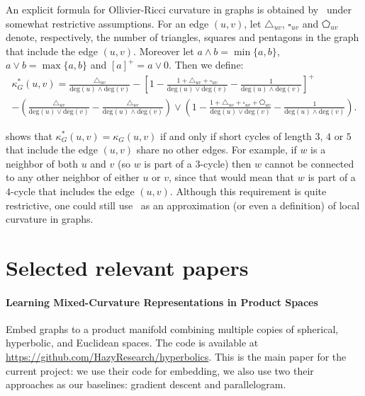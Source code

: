 \documentclass{article}
\begin{document}
An explicit formula for Ollivier-Ricci curvature in graphs is obtained by~\citet{kelly2019self} under somewhat restrictive assumptions. 
For an edge $(u,v)$, let $\triangle_{uv}$, $\square_{uv}$ and $\pentagon_{uv}$ denote, respectively, the number of triangles, squares and pentagons in the graph that include the edge $(u,v)$. Moreover let $a \wedge b = \min\{a,b\}$, $a \vee b = \max\{a,b\}$ and $[a]^+ = a \vee 0$. Then we define:
\begin{multline}\label{eq:def_ollivier_ricci_approx}
		\kappa_G^\ast(u,v) = \frac{\triangle_{uv}}{\mathrm{deg}(u) \wedge \mathrm{deg}(v)} 
			- \left[1 - \frac{1 + \triangle_{uv} + \square_{uv}}{\mathrm{deg}(u) \vee \mathrm{deg}(v)} - \frac{1}{\mathrm{deg}(u) \wedge \mathrm{deg}(v)}\right]^+\\
	- \left(\frac{\triangle_{uv}}{\mathrm{deg}(u) \vee \mathrm{deg}(v)} 
			- \frac{\triangle_{uv}}{\mathrm{deg}(u) \wedge \mathrm{deg}(v)}\right) \vee \left(1 - \frac{1 + \triangle_{uv} + \square_{uv} + \pentagon_{uv}}
			{\mathrm{deg}(u) \vee \mathrm{deg}(v)}
			- \frac{1}{\mathrm{deg}(u) \wedge \mathrm{deg}(v)}\right).
\end{multline}

\citet{kelly2019self} shows that $\kappa_G^\ast(u,v) = \kappa_G(u,v)$ if and only if short cycles of length $3$, $4$ or $5$ that include the edge $(u,v)$ share no other edges. For example, if $w$ is a neighbor of both $u$ and $v$ (so $w$ is part of a $3$-cycle) then $w$ cannot be connected to any other neighbor of either $u$ or $v$, since that would mean that $w$ is part of a $4$-cycle that includes the edge $(u,v)$. Although this requirement is quite restrictive, one could still use~ as an approximation (or even a definition) of local curvature in graphs.

\section{Selected relevant papers}

\paragraph{Learning Mixed-Curvature Representations in Product Spaces~\cite{gu2019learning}}

Embed graphs to a product manifold combining multiple copies of spherical,
hyperbolic, and Euclidean spaces. The code is available at \url{https://github.com/HazyResearch/hyperbolics}. 
This is the main paper for the current project: we use their code for embedding, we also use two their approaches as our baselines: gradient descent and parallelogram. 
\end{document}
